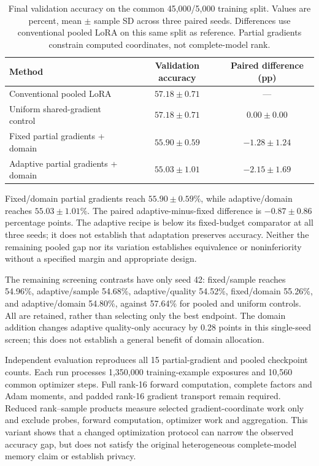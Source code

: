 \documentclass[11pt]{article}
\begin{document}
\begin{table}[t]
\centering
\caption{Final validation accuracy on the common 45,000/5,000 training split. Values are percent, mean $\pm$ sample SD across three paired seeds. Differences use conventional pooled LoRA on this same split as reference. Partial gradients constrain computed coordinates, not complete-model rank.}
\label{tab:masked-results}
\small
\begin{tabular}{lcc}
\toprule
Method & Validation accuracy & Paired difference (pp)\\
\midrule
Conventional pooled LoRA & $57.18\pm0.71$ & ---\\
Uniform shared-gradient control & $57.18\pm0.71$ & $0.00\pm0.00$\\
Fixed partial gradients + domain & $55.90\pm0.59$ & $-1.28\pm1.24$\\
Adaptive partial gradients + domain & $55.03\pm1.01$ & $-2.15\pm1.69$\\
\bottomrule
\end{tabular}
\end{table}

Fixed/domain partial gradients reach $55.90\pm0.59\%$, while adaptive/domain reaches $55.03\pm1.01\%$. The paired adaptive-minus-fixed difference is $-0.87\pm0.86$ percentage points. The adaptive recipe is below its fixed-budget comparator at all three seeds; it does not establish that adaptation preserves accuracy. Neither the remaining pooled gap nor its variation establishes equivalence or noninferiority without a specified margin and appropriate design.

The remaining screening contrasts have only seed 42: fixed/sample reaches 54.96\%, adaptive/sample 54.68\%, adaptive/quality 54.52\%, fixed/domain 55.26\%, and adaptive/domain 54.80\%, against 57.64\% for pooled and uniform controls. All are retained, rather than selecting only the best endpoint. The domain addition changes adaptive quality-only accuracy by 0.28 points in this single-seed screen; this does not establish a general benefit of domain allocation.

Independent evaluation reproduces all 15 partial-gradient and pooled checkpoint counts. Each run processes 1,350,000 training-example exposures and 10,560 common optimizer steps. Full rank-16 forward computation, complete factors and Adam moments, and padded rank-16 gradient transport remain required. Reduced rank--sample products measure selected gradient-coordinate work only and exclude probes, forward computation, optimizer work and aggregation. This variant shows that a changed optimization protocol can narrow the observed accuracy gap, but does not satisfy the original heterogeneous complete-model memory claim or establish privacy.
\end{document}
